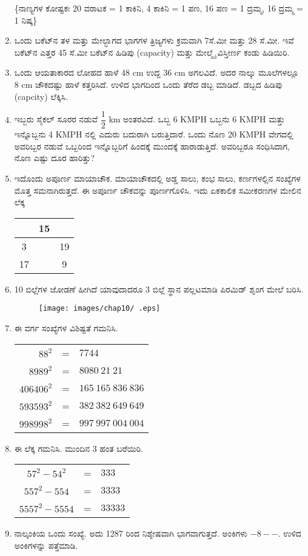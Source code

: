 \begin{enumerate}
\{ನಾಣ್ಯಗಳ ಕೋಷ್ಟಕಃ 20 ವರಾಟಕ = 1 ಕಾಕಿನಿ, 4 ಕಾಕಿನಿ  = 1 ಪಣ, 16 ಪಣ = 1 ದ್ರಮ್ಮ, 16 ದ್ರಮ್ಮ  = 1 ನಿಷ್ಕ\}  

\item ಒಂದು ಬಕೆಟ್‌ನ ತಳ ಮತ್ತು ಮೇಲ್ಭಾಗದ ಭಾಗಗಳ ತ್ರಿಜ್ಯಗಳು ಕ್ರಮವಾಗಿ 7ಸೆ.ಮೀ ಮತ್ತು 28 ಸೆ.ಮೀ. ಇವೆ ಬಕೆಟ್‌ನ ಎತ್ತರ 45 ಸೆ.ಮೀ ಬಕೆಟ್‌ನ ಹಿಡಿಪು (capacity) ಮತ್ತು ಮೇಲ್ಮೈ ವಿಸ್ತೀರ್ಣ ಕಂಡು ಹಿಡಿಯಿರಿ. 

\item ಒಂದು ಆಯತಾಕಾರದ ಲೋಹದ ಹಾಳೆ 48 cm ಉದ್ದ 36 cm ಅಗಲವಿದೆ. ಅದರ ನಾಲ್ಕು ಮೂಲೆಗಳಲ್ಲೂ 8 cm ಚೌಕದಷ್ಟು ಹಾಳೆ ಕತ್ತರಿಸಿದೆ. ಉಳಿದ ಭಾಗದಿಂದ ಒಂದು ತೆರೆದ ಡಬ್ಬ ಮಾಡಿದೆ. ಡಬ್ಬದ ಹಿಡಿಪು (capcity) ಲೆಕ್ಕಿಸಿ. 

\item ಇಬ್ಬರು ಸೈಕಲ್ ಸೂರರ ನಡುವೆ $\dfrac{1}{2}$ km ಅಂತರವಿದೆ. ಒಬ್ಬ 6 KMPH ಒಬ್ಬನು 6 KMPH ಮತ್ತು ಇನ್ನೊಬ್ಬನು 4 KMPH ನಲ್ಲಿ ಎದುರು ಬದುರಾಗಿ ಬರುತ್ತಿದಾರೆ. ಒಂದು ನೊಣ 20 KMPH ವೇಗದಲ್ಲಿ ಅವರಿಬ್ಬರ ನಡುವೆ ಒಬ್ಬರಿಂದ ಇನ್ನೊಬ್ಬರಿಗೆ ಹಿಂದಕ್ಕೆ ಮುಂದಕ್ಕೆ ಹಾರಾಡುತ್ತಿದೆ. ಅವರಿಬ್ಬರೂ ಸಂಧಿಸಿದಾಗ, ನೊಣ ಎಷ್ಟು ದೂರ ಹಾರಿತ್ತು? 

\item ಇದೊಂದು ಅಪೂರ್ಣ ಮಾಯಾಚೌಕ. ಮಾಯಾಚೌಕದಲ್ಲಿ ಅಡ್ಡ ಸಾಲು, ಕಂಭ ಸಾಲು, ಕರ್ಣಗಳಲ್ಲಿನ ಸಂಖ್ಯೆಗಳ ಮೊತ್ತ ಸಮನಾಗಿರುತ್ತದೆ. ಈ ಅಪೂರ್ಣ ಚೌಕವನ್ನು ಪೂರ್ಣಗೊಳಿಸಿ. ಇದು ಏಕಕಾಲಿಕ ಸಮೀಕರಣಗಳ ಮೇಲಿನ ಲೆಕ್ಕ 
\begin{tabular}{|c|c|c|}
\hline
 & 15 & \\
 \hline
 3 & & 19\\
 \hline
 17 & & 9\\
 \hline
 \end{tabular}
 
\item 10 ಬಿಲ್ಲೆಗಳ ಜೋಡಣೆ ಹೀಗಿದೆ ಯಾವುದಾದರೂ 3 ಬಿಲ್ಲೆ ಸ್ಥಾನ ಪಲ್ಲಟಮಾಡಿ ಪಿರಮಿಡ್ ಶೃಂಗ ಮೇಲೆ ಬರಿಸಿ. 
\begin{figure}[!h]
\centering
\texttt{[image: images/chap10/ .eps]}
\end{figure}

\item ಈ ವರ್ಗ ಸಂಖ್ಯೆಗಳ ವಿಶಿಷ್ಟತೆ ಗಮನಿಸಿ. 

\begin{tabular}[t]{rcl}
$88^{2}$ & = & $7744$\\
$8989^{2}$ & = & $8080~21~21$\\
$406406^{2}$ & = & $165~165~836~836$\\
$593593^{2}$ & = & $382~382~649~649$\\
$998998^{2}$ & = & $997~997~004~004$
\end{tabular}

\item ಈ ಲೆಕ್ಕ ಗಮನಿಸಿ. ಮುಂದಿನ 3 ಹಂತ ಬರೆಯಿರಿ. 

\begin{tabular}[t]{ccl}
$57^{2} - 54^{2}$ & = & $333$\\
$557^{2} - 554$ & = & $3333$\\
$5557^{2} - 5554$ & = & $33333$
\end{tabular}

\item ನಾಲ್ಕಂಕಿಯ ಒಂದು ಸಂಖ್ಯೆ. ಅದು 1287 ರಿಂದ ನಿಶ್ಶೇಷವಾಗಿ ಭಾಗವಾಗುತ್ತದೆ. ಅಂಕಿಗಳು $- 8 - -$. ಉಳಿದ ಅಂಕಿಗಳನ್ನು ಪತ್ತೆಮಾಡಿ.  
\end{enumerate}

